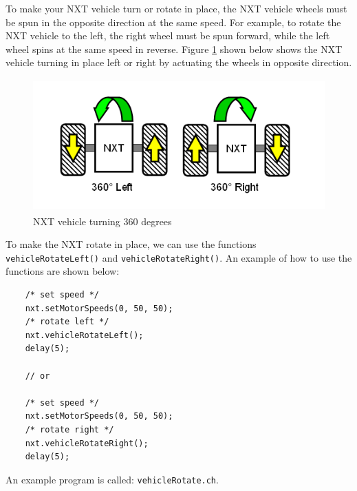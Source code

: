 To make your NXT vehicle turn or rotate in place, the NXT vehicle wheels must be spun in the opposite
direction at the same speed. For example, to rotate the NXT vehicle to the left, the right wheel must
be spun forward, while the left wheel spins at the same speed in reverse. Figure \ref{fig_NXT_360LR} 
shown below shows the NXT vehicle turning in place left or right by actuating the wheels in opposite 
direction.
\begin{figure}[h]
  \begin{center}
    \includegraphics[height=2in]{figure/mindstorm/Vehicle_360LR.png}
    \caption{NXT vehicle turning 360 degrees \label{fig_NXT_360LR}}
  \end{center}
\end{figure}
\noindent
To make the NXT rotate in place, we can use the functions \verb+vehicleRotateLeft()+ 
and \verb+vehicleRotateRight()+.  An example of how to use the functions are shown below:
\begin{verbatim}
    /* set speed */
    nxt.setMotorSpeeds(0, 50, 50);
    /* rotate left */
    nxt.vehicleRotateLeft();
    delay(5);
    
    // or
    
    /* set speed */
    nxt.setMotorSpeeds(0, 50, 50);
    /* rotate right */
    nxt.vehicleRotateRight();
    delay(5);
\end{verbatim}
\noindent
An example program is called: \verb+vehicleRotate.ch+.


